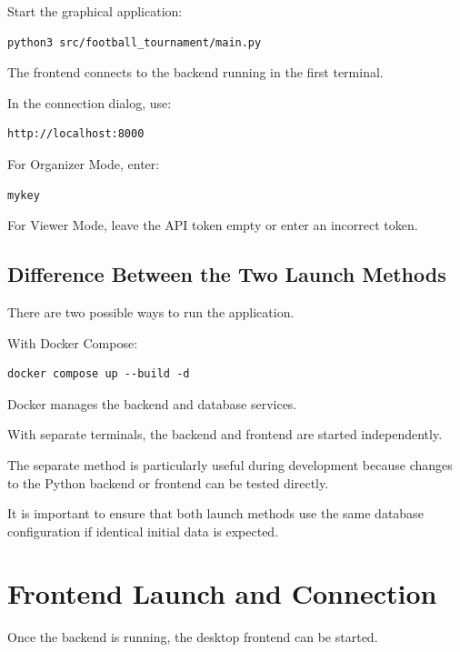 \documentclass[12pt,a4paper]{article}
\begin{document}
Start the graphical application:

\begin{lstlisting}
python3 src/football_tournament/main.py
\end{lstlisting}

The frontend connects to the backend running in the first
terminal.

In the connection dialog, use:

\begin{lstlisting}
http://localhost:8000
\end{lstlisting}

For Organizer Mode, enter:

\begin{lstlisting}
mykey
\end{lstlisting}

For Viewer Mode, leave the API token empty or enter an
incorrect token.

\subsection{Difference Between the Two Launch Methods}

There are two possible ways to run the application.

With Docker Compose:

\begin{lstlisting}
docker compose up --build -d
\end{lstlisting}

Docker manages the backend and database services.

With separate terminals, the backend and frontend are started
independently.

The separate method is particularly useful during development
because changes to the Python backend or frontend can be tested
directly.

It is important to ensure that both launch methods use the same
database configuration if identical initial data is expected.


\section{Frontend Launch and Connection}

Once the backend is running, the desktop frontend can be
started.
\end{document}
